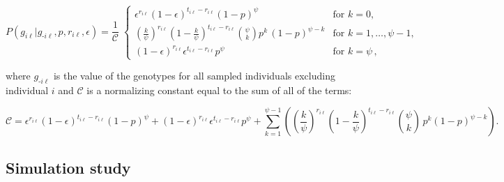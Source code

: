 \documentclass[11pt,english,letterpaper,oneside]{article}
\begin{document}
\begin{equation}\label{G-full}
{P}(g_{i \ell}|g_{\text{-}i \ell},p,r_{i \ell},\epsilon) = \frac{1}{\mathcal{C}} \;
	\begin{cases}
	\epsilon^{r_{i \ell}}(1-\epsilon)^{t_{i \ell}-r_{i \ell}}(1-p)^\psi & \text{for  } k = 0, \\[0.05in]
	\left(\frac{k}{\psi}\right)^{r_{i \ell}}\left(1-\frac{k}{\psi}\right)^{t_{i \ell}-r_{i \ell}}\displaystyle\binom{\psi}{k}p^{k}\,(1-p)^{\psi-k} & \text{for  } k = 1,\ldots,\psi-1, \\[0.05in]
	(1-\epsilon)^{r_{i \ell}}\epsilon^{t_{i \ell}-r_{i \ell}}p^\psi & \text{for  } k = \psi\,,
	\end{cases} 
\end{equation}

\noindent where $g_{\text{-}i \ell}$ is the value of the genotypes for all sampled individuals excluding individual $i$ and $\mathcal{C}$ is a normalizing constant equal to the sum of all of the terms:

\begin{equation*}
\mathcal{C} = \epsilon^{r_{i \ell}}(1-\epsilon)^{t_{i \ell}-r_{i \ell}}(1-p)^\psi + (1-\epsilon)^{r_{i \ell}}\epsilon^{t_{i \ell}-r_{i \ell}}p^\psi + \sum_{k=1}^{\psi-1}\left(\left(\frac{k}{\psi}\right)^{r_{i \ell}}\left(1-\frac{k}{\psi}\right)^{t_{i \ell}-r_{i \ell}}\binom{\psi}{k}\,p^k(1-p)^{\psi-k}\right).
\end{equation*}

\medskip
\subsection*{Simulation study}
\medskip
\end{document}
